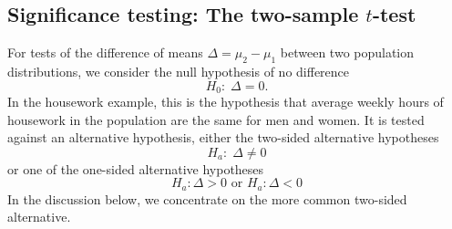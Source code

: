 \subsection{Significance testing: The two-sample $t$-test}
\label{ss_means_inference_test}

For tests of the difference of means
$\Delta=\mu_{2}-\mu_{1}$ between two population distributions, we
consider the null hypothesis of no difference
\begin{equation}
H_{0}: \; \Delta=0.
\label{H0m}
\end{equation}
In the
housework example, this is the hypothesis that average weekly hours of
housework in the population are the same for men and women.
It is tested against an alternative hypothesis, either the
two-sided alternative hypotheses
\begin{equation}
H_{a}: \; \Delta\ne 0
\label{Hatwom}
\end{equation}
or one of the
one-sided alternative hypotheses
\[
H_{a}:  \Delta> 0 \text{ or }

H_{a}:  \Delta< 0
\]
In the discussion below, we concentrate on the more common two-sided
alternative.


